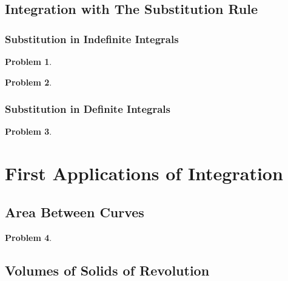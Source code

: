 \documentclass{article}
\newtheorem{problem}{Problem}
\begin{document}
\subsection{Integration with The Substitution Rule}
\label{secMPSintegrationSubstitutionRule}
\subsubsection{Substitution in Indefinite Integrals}
\label{secMPSintegrationSubstitutionRuleIndefinite}
\begin{problem}

\end{problem}

\begin{problem}

\end{problem}


\subsubsection{Substitution in Definite Integrals}
\label{secMPSintegrationSubstitutionRuleDefinite}
\begin{problem}

\end{problem}




\section{First Applications of Integration}
\subsection{Area Between Curves}\label{secMPSareaBetweenCurves}
\begin{problem}

\end{problem}

\subsection{Volumes of Solids of Revolution}\label{secMPSvolumesSolidsRevolution}
\end{document}
